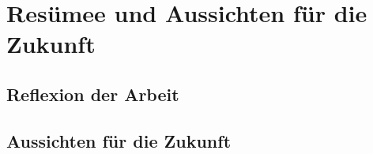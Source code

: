 \newpage
\section{Resümee und Aussichten für die Zukunft}
\subsection{Reflexion der Arbeit}

\subsection{Aussichten für die Zukunft}

